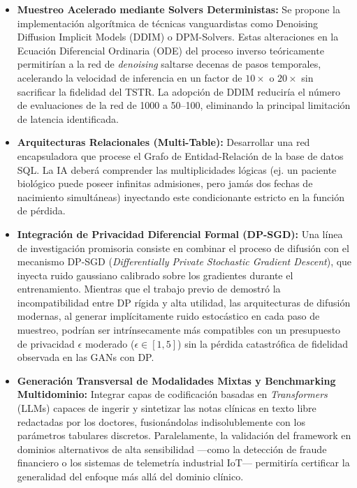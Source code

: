 \begin{itemize}
    \item \textbf{Muestreo Acelerado mediante Solvers Deterministas:} Se propone la implementación algorítmica de técnicas vanguardistas como Denoising Diffusion Implicit Models (DDIM) \parencite{song2021ddim} o DPM-Solvers. Estas alteraciones en la Ecuación Diferencial Ordinaria (ODE) del proceso inverso teóricamente permitirían a la red de \textit{denoising} saltarse decenas de pasos temporales, acelerando la velocidad de inferencia en un factor de $10\times$ o $20\times$ sin sacrificar la fidelidad del TSTR. La adopción de DDIM reduciría el número de evaluaciones de la red de 1000 a 50--100, eliminando la principal limitación de latencia identificada.
    
    \item \textbf{Arquitecturas Relacionales (Multi-Table):} Desarrollar una red encapsuladora que procese el Grafo de Entidad-Relación de la base de datos SQL. La IA deberá comprender las multiplicidades lógicas (ej. un paciente biológico puede poseer infinitas admisiones, pero jamás dos fechas de nacimiento simultáneas) inyectando este condicionante estricto en la función de pérdida.
    
    \item \textbf{Integración de Privacidad Diferencial Formal (DP-SGD):} Una línea de investigación promisoria consiste en combinar el proceso de difusión con el mecanismo DP-SGD (\textit{Differentially Private Stochastic Gradient Descent}), que inyecta ruido gaussiano calibrado sobre los gradientes durante el entrenamiento. Mientras que el trabajo previo de \textcite{dwork2006dp} demostró la incompatibilidad entre DP rígida y alta utilidad, las arquitecturas de difusión modernas, al generar implícitamente ruido estocástico en cada paso de muestreo, podrían ser intrínsecamente más compatibles con un presupuesto de privacidad $\epsilon$ moderado ($\epsilon \in [1, 5]$) sin la pérdida catastrófica de fidelidad observada en las GANs con DP.
    
    \item \textbf{Generación Transversal de Modalidades Mixtas y Benchmarking Multidominio:} Integrar capas de codificación basadas en \textit{Transformers} (LLMs) capaces de ingerir y sintetizar las notas clínicas en texto libre redactadas por los doctores, fusionándolas indisolublemente con los parámetros tabulares discretos. Paralelamente, la validación del framework en dominios alternativos de alta sensibilidad ---como la detección de fraude financiero o los sistemas de telemetría industrial IoT--- permitiría certificar la generalidad del enfoque más allá del dominio clínico.
\end{itemize}

